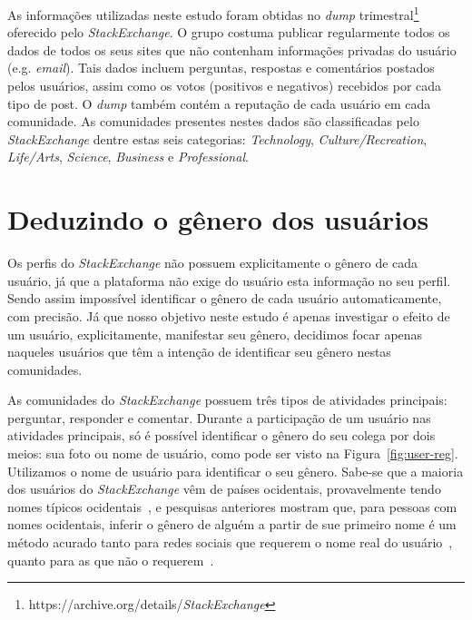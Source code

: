 As informações utilizadas neste estudo foram obtidas no \emph{dump} trimestral\footnote{https://archive.org/details/\emph{StackExchange}} oferecido pelo \emph{StackExchange}. O grupo costuma publicar regularmente todos os dados de todos os seus sites que não contenham informações privadas do usuário (e.g. \emph{email}). Tais dados incluem perguntas, respostas e comentários postados pelos usuários, assim como os votos (positivos e negativos) recebidos por cada tipo de post. O \emph{dump} também contém a reputação de cada usuário em cada comunidade. As comunidades presentes nestes dados são classificadas pelo \emph{StackExchange} dentre estas seis categorias: \emph{Technology}, \emph{Culture/Recreation}, \emph{Life/Arts}, \emph{Science}, \emph{Business} e \emph{Professional}.

\section{Deduzindo o gênero dos usuários}

Os perfis do \emph{StackExchange} não possuem explicitamente o gênero de cada usuário, já que a plataforma não exige do usuário esta informação no seu perfil. Sendo assim impossível identificar o gênero de cada usuário automaticamente, com precisão. Já que nosso objetivo neste estudo é apenas investigar o efeito de um usuário, explicitamente, manifestar seu gênero, decidimos focar apenas naqueles usuários que têm a intenção de identificar seu gênero nestas comunidades.

As comunidades do \emph{StackExchange} possuem três tipos de atividades principais: perguntar, responder e comentar. Durante a participação de um usuário nas atividades principais, só é possível identificar o gênero do seu colega por dois meios: sua foto ou nome de usuário, como pode ser visto na Figura~\ref{fig:user-reg}. Utilizamos o nome de usuário para identificar o seu gênero. Sabe-se que a maioria dos usuários do \emph{StackExchange} vêm de países ocidentais, provavelmente tendo nomes típicos ocidentais~\cite{schenk2013geo}, e pesquisas anteriores mostram que, para pessoas com nomes ocidentais, inferir o gênero de alguém a partir de sue primeiro nome é um método acurado tanto para redes sociais que requerem o nome real do usuário~\cite{tang2011s}, quanto para as que não o requerem~\cite{burger2011discriminating,liu2013s}.

